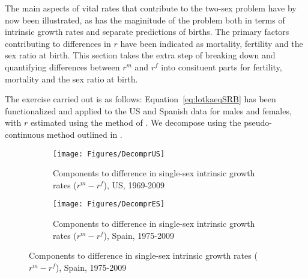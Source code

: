 \label{sec:Decompr}
The main aspects of vital rates that contribute to the two-sex problem have by
now been illustrated, as has the maginitude of the problem both in terms of
intrinsic growth rates and separate predictions of births. The primary factors
contributing to differences in $r$ have been indicated as mortality, fertility
and the sex ratio at birth. This section takes the extra step of breaking
down and quantifying differences between $r^m$ and $r^f$ into consituent parts
for fertility, mortality and the sex ratio at birth. 

The exercise carried out is as follows: Equation~\eqref{eq:lotkaeqSRB} has been
functionalized and applied to the US and Spanish data for males and females,
with $r$ estimated using the method of \citet{coale1957new}. We decompose using the
pseudo-continuous method outlined in \citet{horiuchi2008decomposition}.

\begin{figure}
        \centering
        \begin{subfigure}
                \centering
                \caption{Components to difference in single-sex intrinsic growth
                rates ($r^m - r^f$), US, 1969-2009}
                \texttt{[image: Figures/DecomprUS]}
                \label{fig:DecomprUS}
        \end{subfigure}
        \begin{subfigure}
                \centering
                \caption{Components to difference in single-sex intrinsic growth
                rates ($r^m - r^f$), Spain, 1975-2009}
                \texttt{[image: Figures/DecomprES]}
               
                \label{fig:DecomprES}
        \end{subfigure}
\end{figure}








